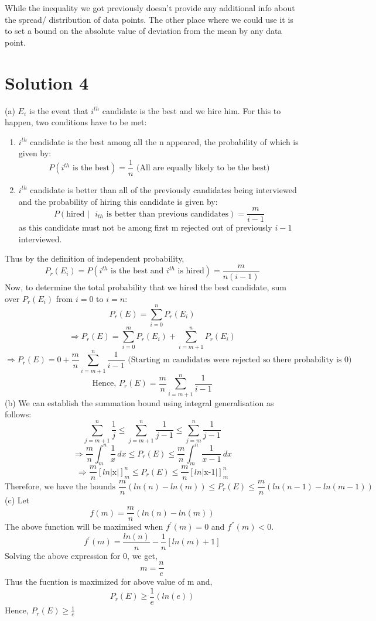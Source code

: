 \documentclass[fleqn]{article}
\begin{document}
While the inequality we got previously doesn't provide any additional info about the spread/ distribution of data points. The other place where we could use it is to set a bound on the absolute value of deviation from the mean by any data point.

\newpage
\section{Solution 4}
(a) $E_i$ is the event that $i^{th}$ candidate is the best and we hire him. For this to happen, two conditions have to be met:
\begin{enumerate}
    \item $i^{th}$ candidate is the best among all the n appeared, the probability of which is given by:
    \[ P(\text{$i^{th}$ is the best})=\frac{1}{n} \text{     (All are equally likely to be the best)} \]
    \item  $i^{th}$ candidate is better than all of the previously candidates being interviewed and the probability of hiring this candidate is given by:
    \[
    P(\text{hired $\vert$ $i_{th}$ is better than previous candidates})=\frac{m}{i-1}
    \]
    as this candidate must not be among first m rejected out of previously $i-1$ interviewed.
\end{enumerate}
Thus by the definition of independent probability, 
\begin{equation}
    P_{r}(E_{i})=P(\text{$i^{th}$ is the best and $i^{th}$ is hired})=\frac{m}{n(i-1)}
\end{equation}
Now, to determine the total probability that we hired the best candidate, sum over $P_{r}(E_{i})$ from $i=0$ to $i=n$:
\[
P_{r}(E)=\sum_{i=0}^{n}{P_{r}(E_{i})}
\]
\[
\Rightarrow P_{r}(E)=\sum_{i=0}^{m}{P_{r}(E_{i})} +\sum_{i=m+1}^{n}{P_{r}(E_{i})}
\]
\[
\Rightarrow P_{r}(E)=0 + \frac{m}{n} \sum_{i=m+1}^{n} {\frac{1}{i-1}} \text{ (Starting m candidates were rejected so there probability is 0)}
\]
\[
\text{Hence, } P_{r}(E)= \frac{m}{n} \sum_{i=m+1}^{n} {\frac{1}{i-1}}
\]
(b) We can establish the summation bound using integral generalisation as follows:
\[
\sum_{j=m+1}^{n}{\frac{1}{j}} \leq \sum_{j=m+1}^{n} {\frac{1}{j-1}} \leq \sum_{j=m}^{n}{\frac{1}{j-1}}
\]
\newline
\[
\Rightarrow \frac{m}{n}\int_{m}^{n} \frac{1}{x} \,dx  \leq P_{r}(E) \leq \frac{m}{n}\int_{m}^{n} \frac{1}{x-1} \,dx
\]
\newline
\[
\Rightarrow \frac{m}{n}[ln\vert \text{x}\vert]_{m}^{n} \leq P_{r}(E) \leq \frac{m}{n}[ln\vert \text{x-1}\vert]_{m}^{n}
\]
\newline
\[
\text{Therefore, we have the bounds } \frac{m}{n}(ln(n)-ln(m)) \leq P_{r}(E) \leq \frac{m}{n} (ln(n-1)-ln(m-1))
\]
(c) Let \[ f(m)= \frac{m}{n}(ln(n)-ln(m))\]
The above function will be maximised when $f^{'}(m)=0$ and $f^{''}(m)<0$.
\[
f^{'}(m)= \frac{ln(n)}{n}-\frac{1}{n}[ln(m) + 1]
\]
Solving the above expression for 0, we get,
\[
m=\frac{n}{e}
\]
Thus the fucntion is maximized for above value of m and,
\[
P_{r}(E) \geq \frac{1}{e}(ln(e))
\] 
Hence, $P_{r}(E) \geq \frac{1}{e}$
\newpage
\end{document}

